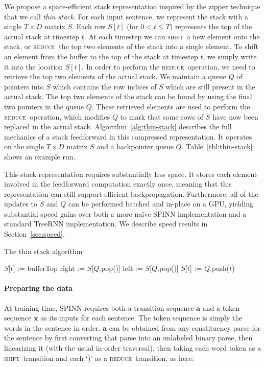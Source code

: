 \documentclass[11pt]{article}
\newcommand{\shift}{\textsc{shift}}
\newcommand{\reduce}{\textsc{reduce}}
\begin{document}
We propose a space-efficient stack representation inspired by the zipper technique \citep{huet1997zipper} that we call \textit{thin stack}. For each input sentence, we represent the stack with a single $T \times D$ matrix $S$. Each row $S[t]$ (for $0<t\le T$) represents the top of the actual stack at timestep $t$. At each timestep we can \shift\ a new element onto the stack, or \reduce\ the top two elements of the stack into a single element. To shift an element from the buffer to the top of the stack at timestep $t$, we simply write it into the location $S[t]$. In order to perform the \reduce\ operation, we need to retrieve the top two elements of the actual stack. We maintain a queue $Q$ of pointers into $S$ which contains the row indices of $S$ which are still present in the actual stack. The top two elements of the stack can be found by using the final two pointers in the queue $Q$. These retrieved elements are used to perform the \reduce\ operation, which modifies $Q$ to mark that some rows of $S$ have now been replaced in the actual stack. Algorithm~\ref{alg:thin-stack} describes the full mechanics of a stack feedforward in this compressed representation. It operates on the single $T \times D$ matrix $S$ and a backpointer queue $Q$. Table~\ref{tbl:thin-stack} shows an example run.

This stack representation requires substantially less space. It stores each element involved in the feedforward computation exactly once, meaning that this representation can still support efficient backpropagation. Furthermore, all of the updates to $S$ and $Q$ can be performed batched and in-place on a GPU, yielding substantial speed gains over both a more na\"ive SPINN implementation and a standard TreeRNN implementation. We describe speed results in Section~\ref{sec:speed}.

\begin{algorithm}[t]
\caption{The thin stack algorithm}
\label{alg:thin-stack}
\begin{algorithmic}[1]
    \If{$a$ = \shift}
      \State $S$[$t$] := bufferTop
    \ElsIf{$a$ = \reduce}
      \State right := $S$[$Q$.pop()]
      \State left := $S$[$Q$.pop()]
      \State $S$[$t$] := 
    \EndIf
    \State $Q$.push($t$)
  \EndFunction
\end{algorithmic}
\end{algorithm}

\paragraph{Preparing the data} At training time, SPINN requires both a transition sequence $\mathbf a$  and a token sequence $\mathbf x$ as its inputs for each sentence. The token sequence is simply the words in the sentence in order. $\mathbf a$ can be obtained from any constituency parse for the sentence by first converting that parse into an unlabeled binary parse, then linearizing it (with the usual in-order traversal), then taking each word token as a \shift\ transition and each `)' as a \reduce\ transition, as here:
\end{document}
